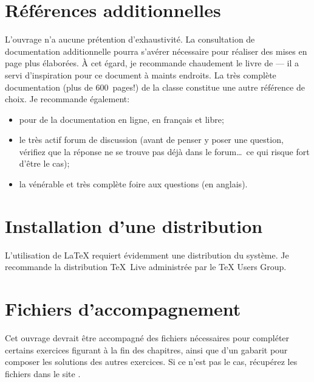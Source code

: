 \section*{Références additionnelles}

L'ouvrage n'a aucune prétention d'exhaustivité. La consultation de
documentation additionnelle pourra s'avérer nécessaire pour réaliser
des mises en page plus élaborées. À cet égard, je recommande
chaudement le livre de \citet{Kopka:latex:4e} --- il a servi
d'inspiration pour ce document à maints endroits. La très complète
documentation (plus de 600~pages!) de la classe 
\citep{memoir} constitue une autre référence de choix. Je recommande
également:
\begin{itemize}
\item {} pour de la documentation en ligne, en français et
  libre;
\item le très actif forum de discussion
  (avant de penser y poser une question, vérifiez que la réponse ne se trouve
  pas déjà dans le forum\dots\ ce qui risque fort d'être le cas);
\item la vénérable et très complète foire aux questions %
  (en anglais).
\end{itemize}

\section*{Installation d'une distribution}

L'utilisation de {\LaTeX} requiert évidemment une distribution du
système. Je recommande la distribution {\TeX}~Live administrée par le
{\TeX} Users Group.


\section*{Fichiers d'accompagnement}

Cet ouvrage devrait être accompagné des fichiers nécessaires pour
compléter certains exercices figurant à la fin des chapitres, ainsi
que d'un gabarit  pour composer les
solutions des autres exercices. Si ce n'est pas le cas, récupérez les
fichiers dans le site .

